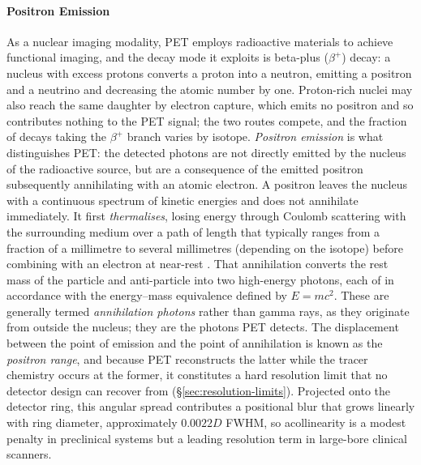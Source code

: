 \paragraph{Positron Emission}
As a nuclear imaging modality, PET employs radioactive materials to achieve functional imaging, and the decay mode it exploits is beta-plus ($\beta^+$) decay: a nucleus with excess protons converts a proton into a neutron, emitting a positron and a neutrino and decreasing the atomic number by one.
Proton-rich nuclei may also reach the same daughter by electron capture, which emits no positron and so contributes nothing to the PET signal; the two routes compete, and the fraction of decays taking the $\beta^+$ branch varies by isotope.
\emph{Positron emission} is what distinguishes PET: the detected photons are not directly emitted by the nucleus of the radioactive source, but are a consequence of the emitted positron subsequently annihilating with an atomic electron.
A positron leaves the nucleus with a continuous spectrum of kinetic energies and does not annihilate immediately.
It first \emph{thermalises}, losing energy through Coulomb scattering with the surrounding medium over a path of length that typically ranges from a fraction of a millimetre to several millimetres (depending on the isotope) before combining with an electron at near-rest \cite{Levin2002}.
That annihilation converts the rest mass of the particle and anti-particle into two high-energy photons, each of  in accordance with the energy--mass equivalence defined by $E=mc^2$.
These are generally termed \emph{annihilation photons} rather than gamma rays, as they originate from outside the nucleus; they are the photons PET detects.
The displacement between the point of emission and the point of annihilation is known as the \emph{positron range}, and because PET reconstructs the latter while the tracer chemistry occurs at the former, it constitutes a hard resolution limit that no detector design can recover from (\S\ref{sec:resolution-limits}).
Projected onto the detector ring, this angular spread contributes a positional blur that grows linearly with ring diameter, approximately $0.0022D$ FWHM, so acollinearity is a modest penalty in preclinical systems but a leading resolution term in large-bore clinical scanners.

